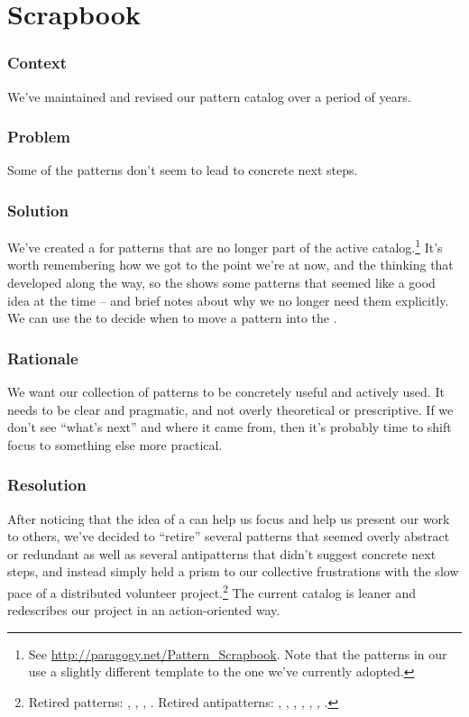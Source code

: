 \section{Scrapbook} \label{sec:Scrapbook}

\subsubsection*{Context} We've maintained and revised our pattern catalog over a period of years.

\subsubsection*{Problem} Some of the patterns don't seem to lead to concrete next steps.

\subsubsection*{Solution} We've created a  for patterns that are no longer part of the active catalog.\footnote{See \url{http://paragogy.net/Pattern_Scrapbook}.  Note that the patterns in our  use a slightly different template to the one we've currently adopted.}  It's worth remembering how we got to the point we're at now, and the thinking that developed along the way, so the  shows some patterns that seemed like a good idea at the time -- and brief notes about why we no longer need them explicitly.  We can use the  to decide when to move a pattern into the .

\subsubsection*{Rationale} We want our collection of patterns to be concretely useful and actively used.  It needs to be clear and pragmatic, and not overly theoretical or prescriptive.  If we don't see ``what's next'' and where it came from, then it's probably time to shift focus to something else more practical.

\subsubsection*{Resolution}  After noticing that the idea of a  can help us focus and help us present our work to others, we've decided to ``retire'' several patterns that seemed overly abstract or redundant as well as several antipatterns that didn't suggest concrete next steps, and instead simply held a prism to our collective frustrations with the slow pace of a distributed volunteer project.\footnote{Retired patterns: , , , . Retired antipatterns: , , , , , , .}  The current catalog is leaner and redescribes our project in an action-oriented way.

